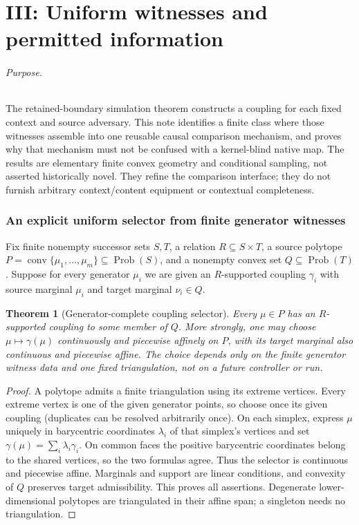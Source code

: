 \documentclass[11pt]{article}
\newtheorem{theorem}{Theorem}\newtheorem{proposition}{Proposition}\newtheorem{corollary}{Corollary}\newtheorem{definition}{Definition}
\begin{document}
\part{III: Uniform witnesses and permitted information}

\paragraph{Purpose.} The retained-boundary simulation theorem constructs a coupling for each fixed context and source adversary. This note identifies a finite class where those witnesses assemble into one reusable causal comparison mechanism, and proves why that mechanism must not be confused with a kernel-blind native map. The results are elementary finite convex geometry and conditional sampling, not asserted historically novel. They refine the comparison interface; they do not furnish arbitrary context/content equipment or contextual completeness.

\section{An explicit uniform selector from finite generator witnesses}
Fix finite nonempty successor sets $S,T$, a relation $R\subseteq S\times T$, a source polytope $P=\operatorname{conv}\{\mu_1,\ldots,\mu_m\}\subseteq\operatorname{Prob}(S)$, and a nonempty convex set $Q\subseteq\operatorname{Prob}(T)$. Suppose for every generator $\mu_i$ we are given an $R$-supported coupling $\gamma_i$ with source marginal $\mu_i$ and target marginal $\nu_i\in Q$.

\begin{theorem}[Generator-complete coupling selector]\label{uni-selector}
Every $\mu\in P$ has an $R$-supported coupling to some member of $Q$. More strongly, one may choose $\mu\mapsto\gamma(\mu)$ continuously and piecewise affinely on $P$, with its target marginal also continuous and piecewise affine. The choice depends only on the finite generator witness data and one fixed triangulation, not on a future controller or run.
\end{theorem}
\begin{proof}
A polytope admits a finite triangulation using its extreme vertices. Every extreme vertex is one of the given generator points, so choose once its given coupling (duplicates can be resolved arbitrarily once). On each simplex, express $\mu$ uniquely in barycentric coordinates $\lambda_i$ of that simplex's vertices and set $\gamma(\mu)=\sum_i\lambda_i\gamma_i$. On common faces the positive barycentric coordinates belong to the shared vertices, so the two formulas agree. Thus the selector is continuous and piecewise affine. Marginals and support are linear conditions, and convexity of $Q$ preserves target admissibility. This proves all assertions. Degenerate lower-dimensional polytopes are triangulated in their affine span; a singleton needs no triangulation.
\end{proof}
\end{document}
